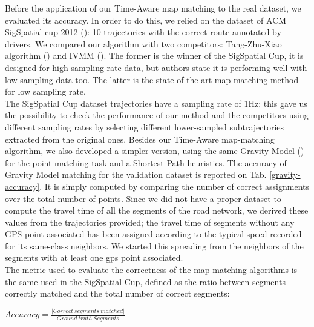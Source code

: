 \documentclass[5p]{elsarticle}
\begin{document}
Before the application of our Time-Aware map matching to the real dataset, we evaluated its accuracy. In order to do this, we relied on the dataset 
of ACM SigSpatial cup 2012 (\cite{ali2012acm}): 10 trajectories with the correct route annotated by drivers. We compared our algorithm with two 
competitors: Tang-Zhu-Xiao algorithm (\cite{tang2012efficient}) and IVMM (\cite{yuan2010interactive}). The former is the winner of the SigSpatial Cup, 
it is designed for high sampling rate data, but authors state it is  performing well with low sampling data too. The latter is the state-of-the-art 
map-matching method for low sampling rate. \\
The SigSpatial Cup dataset trajectories have a sampling rate of 1Hz: this gave us the possibility to check the performance of our method and the competitors using different sampling rates
by selecting different lower-sampled subtrajectories extracted from the original ones. Besides our Time-Aware map-matching algorithm, 
we also developed a simpler version, using the same Gravity Model (\cite{cintia2013gravity}) for the point-matching task and a Shortest Path heuristics.
The accuracy of Gravity Model matching for the validation dataset is reported on Tab. \ref{gravity-accuracy}. It is simply computed by comparing the number of correct assignments over
the total number of points.
 Since we did not have a proper dataset to compute
the travel time of all the segments of the road network, we derived these values from the trajectories provided; the travel time of segments without any GPS point 
associated has been assigned according to the typical speed recorded for its same-class neighbors.  We started this spreading from the neighbors of 
the segments with at least one gps point associated. \\
The metric used to evaluate the correctness of the map matching algorithms is the same used in the SigSpatial Cup, 
defined as the ratio between segments correctly matched and the total number of correct segments: 
\begin{center}
 
\begin{math}
Accuracy= \frac{|Correct\ segments\ matched|} {|Ground\ truth\ Segments|}
\end{math}

\end{center}
\end{document}
